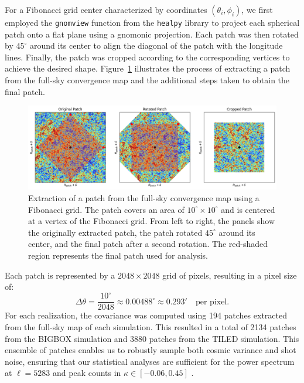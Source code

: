 For a Fibonacci grid center characterized by coordinates \( (\theta_i, \phi_i) \), we first employed the \texttt{gnomview} function from the \texttt{healpy} library \citep{Zonca2019} to project each spherical patch onto a flat plane using a gnomonic projection. Each patch was then rotated by $45^\circ$ around its center to align the diagonal of the patch with the longitude lines. Finally, the patch was cropped according to the corresponding vertices to achieve the desired shape. Figure~\ref{fig:fibonacci_extraction} illustrates the process of extracting a patch from the full-sky convergence map and the additional steps taken to obtain the final patch.
\begin{figure}[ht]
    \centering
    \includegraphics[width=\textwidth]{figures/fibonacci_extraction.png}
    \caption[Extraction of a patch from the full-sky convergence map using a Fibonacci grid]{Extraction of a patch from the full-sky convergence map using a Fibonacci grid. The patch covers an area of $10^\circ \times 10^\circ$ and is centered at a vertex of the Fibonacci grid. From left to right, the panels show the originally extracted patch, the patch rotated $45^\circ$ around its center, and the final patch after a second rotation. The red-shaded region represents the final patch used for analysis.}
    \label{fig:fibonacci_extraction}
\end{figure}

Each patch is represented by a $2048 \times 2048$ grid of pixels, resulting in a pixel size of:
\begin{equation}
    \Delta \theta = \frac{10^\circ}{2048} \approx 0.00488^\circ \approx 0.293' \quad \text{per pixel}.
\end{equation}
For each realization, the covariance was computed using 194 patches extracted from the full-sky map of each simulation. This resulted in a total of 2134 patches from the BIGBOX simulation and 3880 patches from the TILED simulation. This ensemble of patches enables us to robustly sample both cosmic variance and shot noise, ensuring that our statistical analyses are sufficient for the power spectrum at $\ell = 5283$ and peak counts in $ \kappa \in \left[-0.06, 0.45\right]$ \citep{2016PhRvD..93f3524P}.

